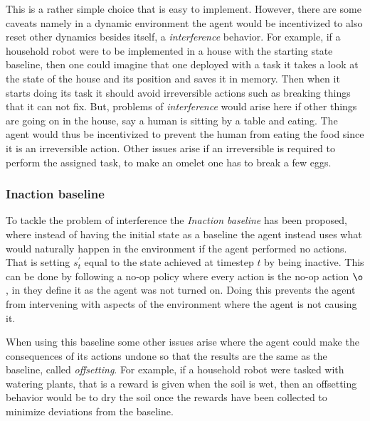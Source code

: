 \documentclass[12pt,A4]{report}
\theoremstyle{definition}
\begin{document}
This is a rather simple choice that is easy to implement. However, there are some caveats namely in a dynamic environment the agent would be incentivized to also reset other dynamics besides itself, a \textit{interference} behavior. For example, if a household robot were to be implemented in a house with the starting state baseline, then one could imagine that one deployed with a task it takes a look at the state of the house and its position and saves it in memory. Then when it starts doing its task it should avoid irreversible actions such as breaking things that it can not fix. But, problems of \textit{interference} would arise here if other things are going on in the house, say a human is sitting by a table and eating. The agent would thus be incentivized to prevent the human from eating the food since it is an irreversible action. Other issues arise if an irreversible is required to perform the assigned task, to make an omelet one has to break a few eggs. 

\subsubsection{Inaction baseline}
To tackle the problem of interference the \textit{Inaction baseline} has been proposed, where instead of having the initial state as a baseline the agent instead uses what would naturally happen in the environment if the agent performed no actions. That is setting $s^\prime_t$ equal to the state achieved at timestep $t$ by being inactive. This can be done by following a no-op policy where every action is the no-op action $\o$, in \autocite{Armstong Levinstein} they define it as the agent was not turned on. Doing this prevents the agent from intervening with aspects of the environment where the agent is not causing it.

When using this baseline some other issues arise where the agent could make the consequences of its actions undone so that the results are the same as the baseline, called \textit{offsetting}. For example, if a household robot were tasked with watering plants, that is a reward is given when the soil is wet, then an offsetting behavior would be to dry the soil once the rewards have been collected to minimize deviations from the baseline. 
\end{document}
